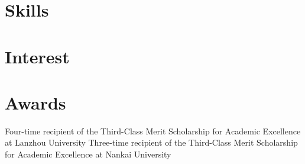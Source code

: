 \documentclass[11pt,a4paper, final]{moderncv}
\newcommand{\spacesection}{\vspace{0.4cm}}
\begin{document}
\section{\textbf{Skills}}
\section{\textbf{Interest}}
\section{\textbf{Awards}}
		{Four-time recipient of the Third-Class Merit Scholarship for Academic Excellence at Lanzhou University}
		{Three-time recipient of the Third-Class Merit Scholarship for Academic Excellence at Nankai University}
\end{document}
